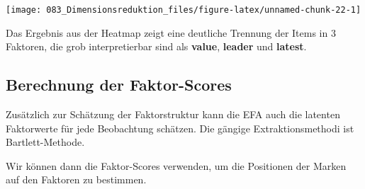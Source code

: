 \documentclass[12pt,]{book}
\makeatletter
\newenvironment{Shaded}{\begin{snugshade}}{\end{snugshade}}
\newcommand{\KeywordTok}[1]{\textcolor[rgb]{0.13,0.29,0.53}{\textbf{{#1}}}}
\newcommand{\DataTypeTok}[1]{\textcolor[rgb]{0.13,0.29,0.53}{{#1}}}
\newcommand{\DecValTok}[1]{\textcolor[rgb]{0.00,0.00,0.81}{{#1}}}
\newcommand{\StringTok}[1]{\textcolor[rgb]{0.31,0.60,0.02}{{#1}}}
\newcommand{\CommentTok}[1]{\textcolor[rgb]{0.56,0.35,0.01}{\textit{{#1}}}}
\newcommand{\NormalTok}[1]{{#1}}
\newenvironment{kframe}{%
\medskip{}
\setlength{\fboxsep}{.8em}
 \def\at@end@of@kframe{}%
 \ifinner\ifhmode%
  \def\at@end@of@kframe{\end{minipage}}%
  \begin{minipage}{\columnwidth}%
 \fi\fi%
 \def\FrameCommand##1{\hskip\@totalleftmargin \hskip-\fboxsep
 \colorbox{shadecolor}{##1}\hskip-\fboxsep
     \hskip-\linewidth \hskip-\@totalleftmargin \hskip\columnwidth}%
 \MakeFramed {\advance\hsize-\width
   \@totalleftmargin\z@ \linewidth\hsize
   \@setminipage}}%
 {\par\unskip\endMakeFramed%
 \at@end@of@kframe}
\renewenvironment{Shaded}{\begin{kframe}}{\end{kframe}}
\makeatother
\begin{document}
\begin{Shaded}
\end{Shaded}

\begin{center}\texttt{[image: 083\_Dimensionsreduktion\_files/figure-latex/unnamed-chunk-22-1]} \end{center}

Das Ergebnis aus der Heatmap zeigt eine deutliche Trennung der Items in
3 Faktoren, die grob interpretierbar sind als \textbf{value},
\textbf{leader} und \textbf{latest}.

\subsection{Berechnung der
Faktor-Scores}\label{berechnung-der-faktor-scores}

Zusätzlich zur Schätzung der Faktorstruktur kann die EFA auch die
latenten Faktorwerte für jede Beobachtung schätzen. Die gängige
Extraktionsmethodi ist Bartlett-Methode.

\begin{Shaded}
\end{Shaded}

Wir können dann die Faktor-Scores verwenden, um die Positionen der
Marken auf den Faktoren zu bestimmen.
\end{document}
